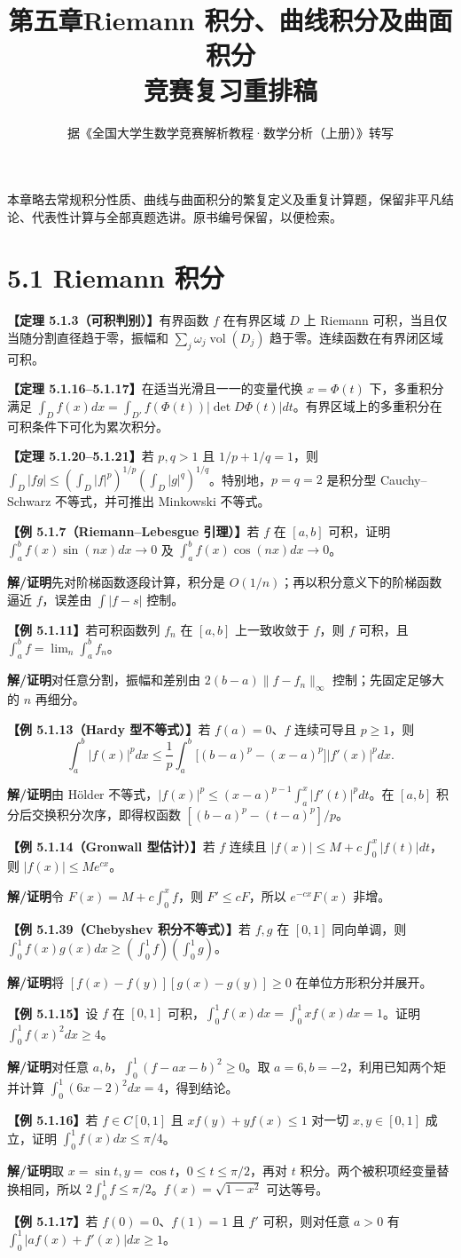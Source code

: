 \documentclass[UTF8,a4paper,11pt]{ctexart}
\title{第五章\quad Riemann 积分、曲线积分及曲面积分\\\large 竞赛复习重排稿}
\author{据《全国大学生数学竞赛解析教程·数学分析（上册）》转写}\date{}
\newcommand{\ex}[1]{\par\medskip\noindent\textbf{【例 #1】}\;}
\newcommand{\thm}[1]{\par\medskip\noindent\textbf{【定理 #1】}\;}
\newcommand{\sol}{\par\noindent\textbf{解/证明}\;}
\begin{document}
\maketitle
\noindent 本章略去常规积分性质、曲线与曲面积分的繁复定义及重复计算题，保留非平凡结论、代表性计算与全部真题选讲。原书编号保留，以便检索。
\section*{5.1 Riemann 积分}
\thm{5.1.3（可积判别）}有界函数 $f$ 在有界区域 $D$ 上 Riemann 可积，当且仅当随分割直径趋于零，振幅和 $\sum_j\omega_j\operatorname{vol}(D_j)$ 趋于零。连续函数在有界闭区域可积。
\thm{5.1.16--5.1.17}在适当光滑且一一的变量代换 $x=\Phi(t)$ 下，多重积分满足 $\int_D f(x)dx=\int_{D'}f(\Phi(t))|\det D\Phi(t)|dt$。有界区域上的多重积分在可积条件下可化为累次积分。
\thm{5.1.20--5.1.21}若 $p,q>1$ 且 $1/p+1/q=1$，则 $\int_D|fg|\le(\int_D|f|^p)^{1/p}(\int_D|g|^q)^{1/q}$。特别地，$p=q=2$ 是积分型 Cauchy--Schwarz 不等式，并可推出 Minkowski 不等式。
\ex{5.1.7（Riemann--Lebesgue 引理）}若 $f$ 在 $[a,b]$ 可积，证明 $\int_a^b f(x)\sin(nx)dx\to0$ 及 $\int_a^b f(x)\cos(nx)dx\to0$。
\sol 先对阶梯函数逐段计算，积分是 $O(1/n)$；再以积分意义下的阶梯函数逼近 $f$，误差由 $\int|f-s|$ 控制。
\ex{5.1.11}若可积函数列 $f_n$ 在 $[a,b]$ 上一致收敛于 $f$，则 $f$ 可积，且 $\int_a^b f=\lim_n\int_a^bf_n$。
\sol 对任意分割，振幅和差别由 $2(b-a)\|f-f_n\|_\infty$ 控制；先固定足够大的 $n$ 再细分。
\ex{5.1.13（Hardy 型不等式）}若 $f(a)=0$、$f$ 连续可导且 $p\ge1$，则
\[\int_a^b|f(x)|^pdx\le\frac1p\int_a^b\bigl[(b-a)^p-(x-a)^p\bigr]|f'(x)|^pdx.\]
\sol 由 Hölder 不等式，$|f(x)|^p\le(x-a)^{p-1}\int_a^x|f'(t)|^pdt$。在 $[a,b]$ 积分后交换积分次序，即得权函数 $[(b-a)^p-(t-a)^p]/p$。
\ex{5.1.14（Gronwall 型估计）}若 $f$ 连续且 $|f(x)|\le M+c\int_0^x|f(t)|dt$，则 $|f(x)|\le Me^{cx}$。
\sol 令 $F(x)=M+c\int_0^xf$，则 $F'\le cF$，所以 $e^{-cx}F(x)$ 非增。
\ex{5.1.39（Chebyshev 积分不等式）}若 $f,g$ 在 $[0,1]$ 同向单调，则 $\int_0^1f(x)g(x)dx\ge(\int_0^1f)(\int_0^1g)$。
\sol 将 $[f(x)-f(y)][g(x)-g(y)]\ge0$ 在单位方形积分并展开。
\ex{5.1.15}设 $f$ 在 $[0,1]$ 可积，$\int_0^1f(x)dx=\int_0^1xf(x)dx=1$。证明 $\int_0^1f(x)^2dx\ge4$。
\sol 对任意 $a,b$，$\int_0^1(f-ax-b)^2\ge0$。取 $a=6,b=-2$，利用已知两个矩并计算 $\int_0^1(6x-2)^2dx=4$，得到结论。
\ex{5.1.16}若 $f\in C[0,1]$ 且 $xf(y)+yf(x)\le1$ 对一切 $x,y\in[0,1]$ 成立，证明 $\int_0^1f(x)dx\le\pi/4$。
\sol 取 $x=\sin t,y=\cos t$，$0\le t\le\pi/2$，再对 $t$ 积分。两个被积项经变量替换相同，所以 $2\int_0^1f\le\pi/2$。$f(x)=\sqrt{1-x^2}$ 可达等号。
\ex{5.1.17}若 $f(0)=0$、$f(1)=1$ 且 $f'$ 可积，则对任意 $a>0$ 有 $\int_0^1|af(x)+f'(x)|dx\ge1$。
\end{document}
